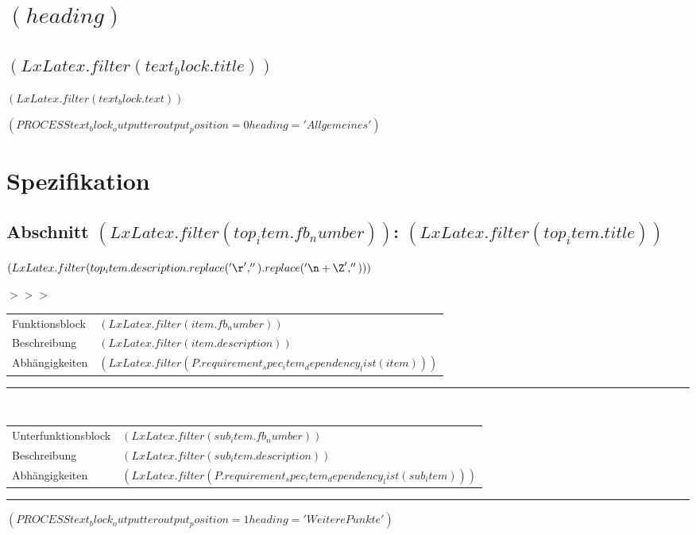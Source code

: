 \documentclass{scrartcl}
\begin{document}
  \newpage

  \section{$( heading )$}


    \subsection{$( LxLatex.filter(text_block.title) )$}

$( LxLatex.filter(text_block.text) )$


$( PROCESS text_block_outputter output_position=0 heading='Allgemeines' )$

\newpage

\section{Spezifikation}

\setlength{\LTpre}{-0.3cm}



  \subsection{Abschnitt $( LxLatex.filter(top_item.fb_number) )$: $( LxLatex.filter(top_item.title) )$}

    $( LxLatex.filter(top_item.description.replace('\r', '').replace('\n+\Z', '')) )$

    \vspace{0.5cm}
\parbox[t]{1.0cm}{\textcolor{kivitendodarkred}{$>>>$}}%
\parbox[t]{15.0cm}{%
\begin{longtable}{p{2.8cm}p{11.7cm}}
  Funktionsblock & $( LxLatex.filter(item.fb_number) )$\\
  Beschreibung & $( LxLatex.filter(item.description) )$\\
  Abhängigkeiten & $( LxLatex.filter(P.requirement_spec_item_dependency_list(item)) )$
\end{longtable}}

\hspace*{1.15cm}\rule{15.2cm}{0.2pt}\\
\hspace*{1.0cm}%
\parbox[t]{15.0cm}{%
\begin{longtable}{p{2.8cm}p{11.7cm}}
  Unterfunktionsblock & $( LxLatex.filter(sub_item.fb_number) )$\\
  Beschreibung & $( LxLatex.filter(sub_item.description) )$\\
  Abhängigkeiten & $( LxLatex.filter(P.requirement_spec_item_dependency_list(sub_item)) )$
\end{longtable}}


\vspace{0.2cm}
\hrule
\vspace{0.4cm}


%

$( PROCESS text_block_outputter output_position=1 heading='Weitere Punkte' )$
\end{document}
